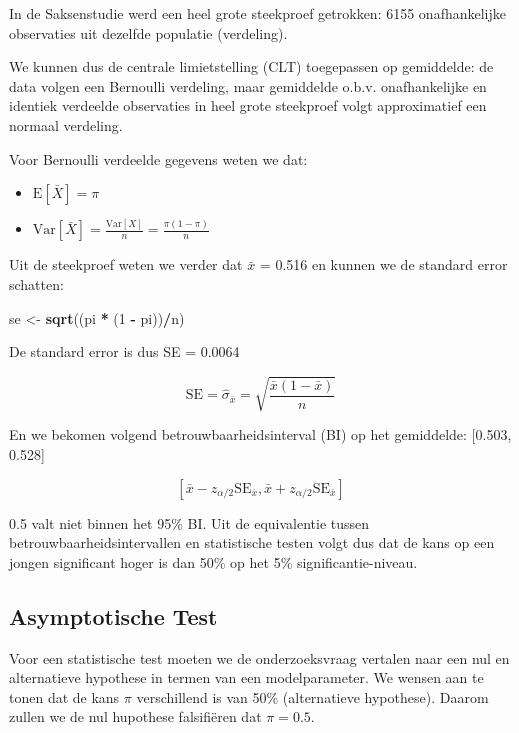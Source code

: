 \documentclass[
  12pt,dutch,coursenotes]{book}
\newenvironment{Shaded}{\begin{snugshade}}{\end{snugshade}}
\newcommand{\DecValTok}[1]{\textcolor[rgb]{0.00,0.00,0.81}{#1}}
\newcommand{\KeywordTok}[1]{\textcolor[rgb]{0.13,0.29,0.53}{\textbf{#1}}}
\newcommand{\NormalTok}[1]{#1}
\newcommand{\OperatorTok}[1]{\textcolor[rgb]{0.81,0.36,0.00}{\textbf{#1}}}
\newcommand{\StringTok}[1]{\textcolor[rgb]{0.31,0.60,0.02}{#1}}
\providecommand{\tightlist}{%
  \setlength{\itemsep}{0pt}\setlength{\parskip}{0pt}}
\theoremstyle{definition}
\theoremstyle{definition}
\theoremstyle{definition}
\theoremstyle{remark}
\begin{document}
In de Saksenstudie werd een heel grote steekproef getrokken: 6155 onafhankelijke observaties uit dezelfde populatie (verdeling).

We kunnen dus de centrale limietstelling (CLT) toegepassen op gemiddelde:
de data volgen een Bernoulli verdeling, maar gemiddelde o.b.v. onafhankelijke en identiek verdeelde observaties in heel grote steekproef volgt approximatief een normaal verdeling.

Voor Bernoulli verdeelde gegevens weten we dat:

\begin{itemize}
\tightlist
\item
  \(\text{E}[\bar X] = \pi\)
\item
  \(\text{Var}[\bar X] = \frac{\text{Var}[X]}{n} = \frac{\pi(1-\pi)}{n}\)
\end{itemize}

Uit de steekproef weten we verder dat \(\bar x\) = 0.516 en kunnen we de standard error schatten:

\begin{Shaded}
\begin{Highlighting}[]
\NormalTok{se \textless{}{-}}\StringTok{ }\KeywordTok{sqrt}\NormalTok{((pi }\OperatorTok{*}\StringTok{ }\NormalTok{(}\DecValTok{1} \OperatorTok{{-}}\StringTok{ }\NormalTok{pi))}\OperatorTok{/}\NormalTok{n)}
\end{Highlighting}
\end{Shaded}

De standard error is dus SE = 0.0064

\[
\text{SE} = \hat\sigma_{\bar x} = \sqrt{\frac{\bar x(1-\bar x)}{n}} \]

En we bekomen volgend betrouwbaarheidsinterval (BI) op het gemiddelde: {[}0.503, 0.528{]}

\[ [\bar x - z_{\alpha/2} \text{SE}_{\bar x}, \bar x + z_{\alpha/2} \text{SE}_{\bar x}]\]

0.5 valt niet binnen het 95\% BI. Uit de equivalentie tussen betrouwbaarheidsintervallen en statistische testen volgt dus dat de kans op een jongen significant hoger is dan 50\% op het 5\% significantie-niveau.

\hypertarget{asymptotische-test}{%
\subsection{Asymptotische Test}\label{asymptotische-test}}

Voor een statistische test moeten we de onderzoeksvraag vertalen naar een nul en alternatieve hypothese in termen van een modelparameter.
We wensen aan te tonen dat de kans \(\pi\) verschillend is van 50\% (alternatieve hypothese).
Daarom zullen we de nul hupothese falsifiëren dat \(\pi = 0.5\).
\end{document}
